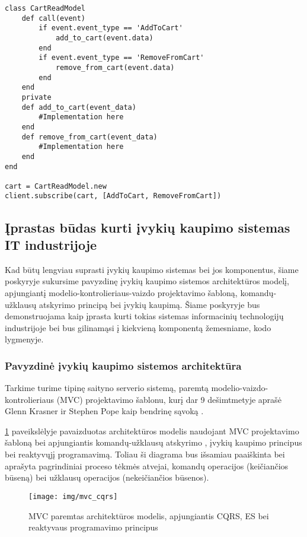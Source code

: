 \begin{lstlisting}[caption=``EventStore'' bibliotekos prenumeratorių mechanizmo panaudojimas, label=event_store_subscription]
class CartReadModel
    def call(event)
        if event.event_type == 'AddToCart'
            add_to_cart(event.data)
        end
        if event.event_type == 'RemoveFromCart'
            remove_from_cart(event.data)
        end
    end
    private
    def add_to_cart(event_data)
        #Implementation here
    end
    def remove_from_cart(event_data)
        #Implementation here
    end 
end
 
cart = CartReadModel.new
client.subscribe(cart, [AddToCart, RemoveFromCart]) 
\end{lstlisting}

\subsection{Įprastas būdas kurti įvykių kaupimo sistemas IT industrijoje}

Kad būtų lengviau suprasti įvykių kaupimo sistemas bei jos komponentus, šiame poskyryje sukursime pavyzdinę įvykių kaupimo sistemos architektūros modelį, apjungiantį modelio-kontrolieriaus-vaizdo projektavimo šabloną, komandų-užklausų atskyrimo principą bei įvykių kaupimą. Šiame poskyryje bus demonstruojama kaip įprasta kurti tokias sistemas informacinių technologijų industrijoje bei bus gilinamąsi į kiekvieną komponentą žemesniame, kodo lygmenyje.

\subsubsection{Pavyzdinė įvykių kaupimo sistemos architektūra}

Tarkime turime tipinę saityno serverio sistemą, paremtą modelio-vaizdo-kontrolieriaus (MVC) projektavimo šablonu, kurį dar 9 dešimtmetyje aprašė Glenn Krasner ir Stephen Pope kaip bendrinę sąvoką \cite{Krasner:1988:CUM:50757.50759}.

\ref{img:mvc_cqrs} paveikslėlyje pavaizduotas architektūros modelis naudojant MVC projektavimo šabloną bei apjungiantis komandų-užklausų atskyrimo , įvykių kaupimo principus bei reaktyvųjį programavimą. Toliau ši diagrama bus išsamiau paaiškinta bei aprašyta pagrindiniai proceso tėkmės atvejai, komandų operacijos (keičiančios būseną) bei užklausų operacijos (nekeičiančios būsenos).

\begin{figure}[H]
    \centering
    \texttt{[image: img/mvc\_cqrs]}
    \caption{MVC paremtas architektūros modelis, apjungiantis CQRS, ES bei reaktyvaus programavimo principus}
    \label{img:mvc_cqrs}
\end{figure}

